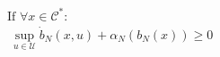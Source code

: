 \documentclass[preview]{standalone}
\begin{document}
\begin{align*}
&\text{If }\forall x \in \mathcal{C}^*:\\ &\ \sup_{u \in \mathcal{U}} \dot b_N(x, u) + \alpha_N(b_N(x)) \geq 0
\end{align*}
\end{document}
